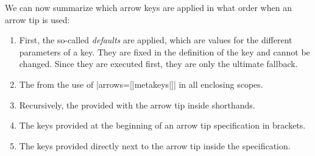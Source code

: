 We can now summarize which arrow keys are applied in what order when
an arrow tip is used:
\begin{enumerate}
\item First, the so-called \emph{defaults} are applied, which are
  values for the different parameters of a key. They are fixed in the
  definition of the key and cannot be changed. Since they are executed
  first, they are only the ultimate fallback.
\item The  from the use of |arrows=[|meta{keys}|]| in all
  enclosing scopes.
\item Recursively, the  provided with the arrow
  tip inside shorthands.
\item The keys provided at the beginning of an arrow tip specification
  in brackets.
\item The keys provided directly next to the arrow tip inside the
  specification. 
\end{enumerate}

